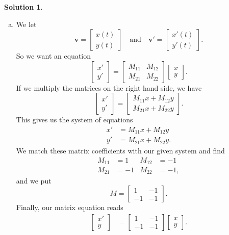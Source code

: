 \documentclass[12pt]{report} %
\theoremstyle{definition}
\newtheorem{solution}{Solution}
\begin{document}
\begin{solution}~
\begin{enumerate}[(a)]
    \item We let
    \[
    \mathbf{v}=\begin{bmatrix} x(t) \\ y(t) \end{bmatrix} \quad \textrm{and} \quad \mathbf{v}' = \begin{bmatrix} x'(t) \\ y'(t) \end{bmatrix}.
    \]
    So we want an equation
    \[
    \begin{bmatrix} x' \\ y' \end{bmatrix} = \begin{bmatrix} M_{11} & M_{12} \\ M_{21} & M_{22} \end{bmatrix} \begin{bmatrix} x \\ y \end{bmatrix}.
    \]
    If we multiply the matrices on the right hand side, we have
    \[
    \begin{bmatrix} x' \\ y' \end{bmatrix} = \begin{bmatrix} M_{11}x+ M_{12}y \\ M_{21} x + M_{22} y\end{bmatrix}.
    \]
    This gives us the system of equations
    \begin{align*}
        x' &= M_{11}x + M_{12}y\\
        y' &= M_{21}x+ M_{22}y.
    \end{align*}
    We match these matrix coefficients with our given system and find
    \begin{align*}
        M_{11} &= 1 & M_{12}&=-1\\
        M_{21} &= -1 & M_{22}&=-1,
    \end{align*}
    and we put
    \[
    M = \begin{bmatrix} 1 & -1 \\ -1 & -1 \end{bmatrix}.
    \]
    Finally, our matrix equation reads
    \begin{align*}
        \begin{bmatrix} x' \\ y\ \end{bmatrix} &= \begin{bmatrix} 1 & -1 \\ -1 & -1 \end{bmatrix} \begin{bmatrix} x \\ y \end{bmatrix}.

\end{align*}
\end{enumerate}
\end{solution}
\end{document}
